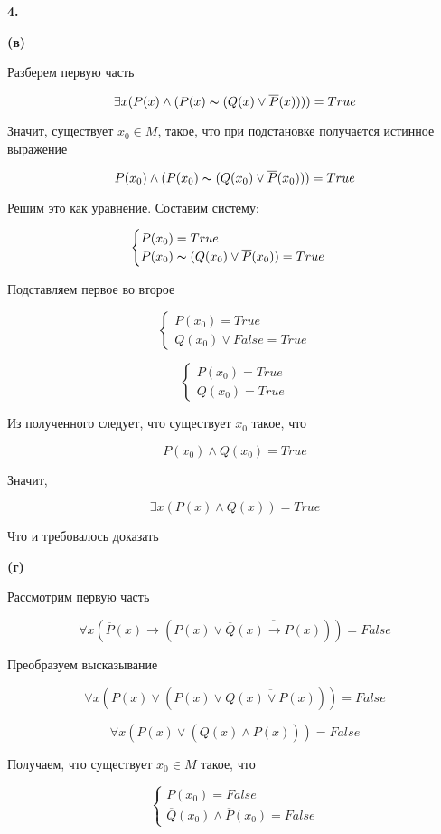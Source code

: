 \documentclass{article}
\begin{document}
\textbf{4.}

\textbf{(в)}

Разберем первую часть 

$$\exists x (P(x) \wedge (P(x) \thicksim (Q(x) \vee  \overline{P} (x) ))) = True$$

Значит, существует $x_0 \in M$, такое, что при подстановке получается истинное выражение 

$$P(x_0) \wedge (P(x_0) \thicksim (Q(x_0) \vee  \overline{P} (x_0) )) = True$$

Решим это как уравнение. Составим систему:

$$\begin{cases} P(x_0) = True \\ 
P(x_0) \thicksim (Q(x_0) \vee  \overline{P} (x_0) ) = True  \end{cases} $$

Подставляем первое во второе

$$\begin{cases} P(x_0) = True \\ Q(x_0) \vee  False = True \end{cases} $$

$$\begin{cases} P(x_0) = True \\ Q(x_0) = True \end{cases} $$

Из полученного следует, что существует $x_0$ такое, что

$$P(x_0) \wedge Q(x_0) = True$$

Значит,

$$\exists x (P(x) \wedge Q(x)) = True$$

Что и требовалось доказать


\textbf{(г)}

Рассмотрим первую часть 

$$ \forall x (\overline{P} (x) \rightarrow (P(x) \vee \overline{ \overline{Q} (x) \rightarrow P (x) })) = False $$

Преобразуем высказывание

$$ \forall x (P(x) \vee (P(x) \vee \overline{ Q (x) \vee P (x) })) = False $$

$$ \forall x (P(x) \vee ( \overline{ Q } (x) \wedge \overline{P} (x) )) = False $$

Получаем, что существует $x_0 \in M$ такое, что 

$$\begin{cases} P(x_0) = False \\ \overline{ Q } (x_0) \wedge \overline{P} (x_0) = False \end{cases} $$
\end{document}
